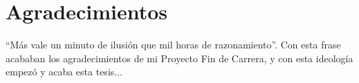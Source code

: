 %

\chapter*{Agradecimientos}
\label{cha:agradecimientos}



``Más vale un minuto de ilusión que mil horas de razonamiento''. Con
esta frase acababan los agradecimientos de mi Proyecto Fin de Carrera,
y con esta ideología empezó y acaba esta tesis...

